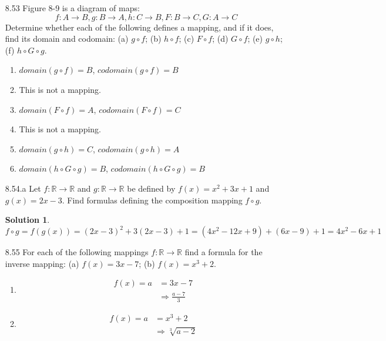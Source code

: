 \documentclass[12pt]{article}
\theoremstyle{definition}
\newtheorem*{solution}{Solution} %
\theoremstyle{plain}
\begin{document}
\begin{enumerate}
\item[8.53] Figure 8-9 is a diagram of maps:
\[ f: A\rightarrow B, g: B \rightarrow A, h: C \rightarrow B, F: B\rightarrow C, G:A\rightarrow C \]
Determine whether each of the following defines a mapping, and if it does, find its domain and codomain: (a) $g \circ f$; (b) $h \circ f$; (c) $F \circ f$; (d) $G \circ f$; (e) $g \circ h$; (f) $h \circ G \circ g$.
	\begin{enumerate}
	\item $domain(g \circ f) = B$, $codomain(g \circ f)=B$
	\item This is not a mapping.
	\item $domain(F \circ f)=A$, $codomain(F \circ f)=C$
	\item This is not a mapping.
	\item $domain(g \circ h)=C$, $codomain(g \circ h)=A$
	\item $domain(h\circ G\circ g)=B$, $codomain(h\circ G\circ g)=B$
	\end{enumerate}
	
\item[8.54.a] Let $f: \mathbb{R} \rightarrow \mathbb{R}$ and $g: \mathbb{R} \rightarrow \mathbb{R}$ be defined by $f(x)=x^2+3x+1$ and $g(x)=2x-3$. Find formulas defining the composition mapping $f \circ g$.
	\begin{solution}
	\[ f \circ g = f(g(x)) = (2x-3)^2+3(2x-3)+1 = (4x^2-12x+9) + (6x-9) + 1 = 4x^2-6x+1 \]
	\end{solution}

\item[8.55] For each of the following mappings $f: \mathbb{R} \rightarrow \mathbb{R}$ find a formula for the inverse mapping: (a) $f(x)=3x-7$; (b) $f(x)=x^3+2$.
	\begin{enumerate}
	\item
	\begin{align*}
	f(x) = a &= 3x-7\\
	&\Rightarrow \frac{a-7}{3}
	\end{align*}
	
	\item
	\begin{align*}
	f(x) = a &= x^3+2\\
	&\Rightarrow \sqrt[3]{a-2}
	\end{align*}
	\end{enumerate}
	

\end{enumerate}
\end{document}

